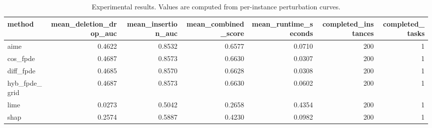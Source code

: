 \begin{table}[t]
\caption{Experimental results. Values are computed from per-instance perturbation curves.}
\label{tab:main_results_computed}
\centering
\begin{tabular}{lrrrrrr}
\toprule
method & mean\_deletion\_drop\_auc & mean\_insertion\_auc & mean\_combined\_score & mean\_runtime\_seconds & completed\_instances & completed\_tasks \\
\midrule
aime & 0.4622 & 0.8532 & 0.6577 & 0.0710 & 200 & 1 \\
cos\_fpde & 0.4687 & 0.8573 & 0.6630 & 0.0307 & 200 & 1 \\
diff\_fpde & 0.4685 & 0.8570 & 0.6628 & 0.0308 & 200 & 1 \\
hyb\_fpde\_grid & 0.4687 & 0.8573 & 0.6630 & 0.0602 & 200 & 1 \\
lime & 0.0273 & 0.5042 & 0.2658 & 0.4354 & 200 & 1 \\
shap & 0.2574 & 0.5887 & 0.4230 & 0.0982 & 200 & 1 \\
\bottomrule
\end{tabular}

\end{table}
